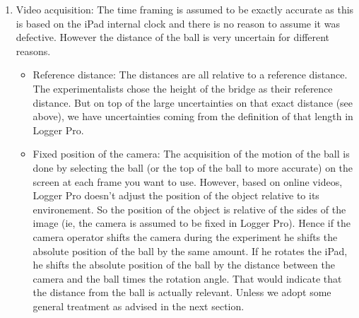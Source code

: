 \documentclass{article}
\begin{document}
\begin{enumerate}
 \item Video acquisition: The time framing is assumed to be exactly accurate as this is based on the iPad internal clock and there is no reason to assume it was defective. However the distance of the ball is very uncertain for different reasons.
\begin{itemize}
 \item Reference distance: The distances are all relative to a reference distance. The experimentalists chose the height of the bridge as their reference distance. But on top of the large uncertainties on that exact distance (see above), we have uncertainties coming from the definition of that length in Logger Pro.
 \item Fixed position of the camera: The acquisition of the motion of the ball is done by selecting the ball (or the top of the ball to more accurate) on the screen at each frame you want to use. However, based on online videos, Logger Pro doesn't adjust the position of the object relative to its environement. So the position of the object is relative of the sides of the image (ie, the camera is assumed to be fixed in Logger Pro). Hence if the camera operator shifts the camera during the experiment he shifts the absolute position of the ball by the same amount. If he rotates the iPad, he shifts the absolute position of the ball by the distance between the camera and the ball times the rotation angle. That would indicate that the distance from the ball is actually relevant. Unless we adopt some general treatment as advised in the next section.
\end{itemize}

\end{enumerate}
\end{document}
